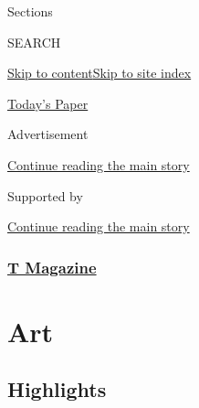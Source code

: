 Sections

SEARCH

\protect\hyperlink{site-content}{Skip to
content}\protect\hyperlink{site-index}{Skip to site index}

\href{https://myaccount.nytimes3xbfgragh.onion/auth/login?response_type=cookie\&client_id=vi}{}

\href{https://www.nytimes3xbfgragh.onion/section/todayspaper}{Today's
Paper}

Advertisement

\protect\hyperlink{after-top}{Continue reading the main story}

Supported by

\protect\hyperlink{after-sponsor}{Continue reading the main story}

\hypertarget{t-magazine}{%
\subsubsection{\texorpdfstring{\href{/section/t-magazine}{T
Magazine}}{T Magazine}}\label{t-magazine}}

\hypertarget{art}{%
\section{Art}\label{art}}

\hypertarget{highlights}{%
\subsection{Highlights}\label{highlights}}

